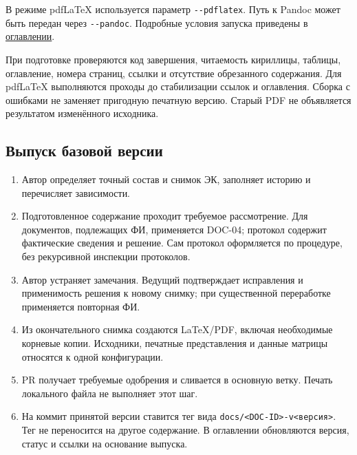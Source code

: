 \documentclass[12pt,a4paper]{article}
\newcommand{\tightlist}{\setlength{\itemsep}{0pt}\setlength{\parskip}{0pt}}
\begin{document}
В режиме pdfLaTeX используется параметр \texttt{-\/-pdflatex}. Путь к Pandoc может быть передан через \texttt{-\/-pandoc}. Подробные условия запуска приведены в \href{https://github.com/Kokorev-VD/mephi-samolety/blob/main/docs/README.md\#\%D1\%81\%D0\%B1\%D0\%BE\%D1\%80\%D0\%BA\%D0\%B0}{оглавлении}.

При подготовке проверяются код завершения, читаемость кириллицы, таблицы, оглавление, номера страниц, ссылки и отсутствие обрезанного содержания. Для pdfLaTeX выполняются проходы до стабилизации ссылок и оглавления. Сборка с ошибками не заменяет пригодную печатную версию. Старый PDF не объявляется результатом изменённого исходника.

\subsection{Выпуск базовой версии}\label{ux432ux44bux43fux443ux441ux43a-ux431ux430ux437ux43eux432ux43eux439-ux432ux435ux440ux441ux438ux438}

\hypertarget{выпуск-базовой-версии}{}

\begin{enumerate}
\def\labelenumi{\arabic{enumi}.}
\tightlist
\item
  Автор определяет точный состав и снимок ЭК, заполняет историю и перечисляет зависимости.
\item
  Подготовленное содержание проходит требуемое рассмотрение. Для документов, подлежащих ФИ, применяется DOC-04; протокол содержит фактические сведения и решение. Сам протокол оформляется по процедуре, без рекурсивной инспекции протоколов.
\item
  Автор устраняет замечания. Ведущий подтверждает исправления и применимость решения к новому снимку; при существенной переработке применяется повторная ФИ.
\item
  Из окончательного снимка создаются LaTeX/PDF, включая необходимые корневые копии. Исходники, печатные представления и данные матрицы относятся к одной конфигурации.
\item
  PR получает требуемые одобрения и сливается в основную ветку. Печать локального файла не выполняет этот шаг.
\item
  На коммит принятой версии ставится тег вида \texttt{docs/\allowbreak{}<DOC-\allowbreak{}ID>-\allowbreak{}v<версия>}. Тег не переносится на другое содержание. В оглавлении обновляются версия, статус и ссылки на основание выпуска.
\end{enumerate}
\end{document}
